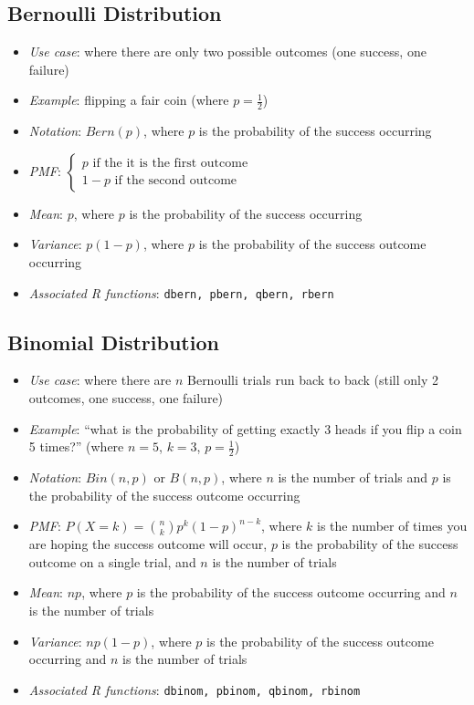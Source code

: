 \documentclass[12pt]{article}
\begin{document}
\subsection{Bernoulli Distribution}
\begin{itemize}
	\item \textit{Use case}: where there are only two possible outcomes (one success, one failure)
	\item \textit{Example}: flipping a fair coin (where $p = \frac{1}{2}$)
	\item \textit{Notation}: $Bern(p)$, where $p$ is the probability of the success occurring
	\item \textit{PMF}: $\begin{cases}
			      p \text{ if the it is the first outcome} \\
			      1 - p \text{ if the second outcome}
		      \end{cases}$
	\item \textit{Mean}: $p$, where $p$ is the probability of the success occurring
	\item \textit{Variance}: $p(1-p)$, where $p$ is the probability of the success outcome occurring
	\item \textit{Associated R functions}: \verb|dbern, pbern, qbern, rbern|
\end{itemize}

\subsection{Binomial Distribution}
\begin{itemize}
	\item \textit{Use case}: where there are $n$ Bernoulli trials run back to
	      back (still only 2 outcomes, one success, one failure)
	\item \textit{Example}: ``what is the probability of getting exactly 3
	      heads if you flip a coin 5 times?'' (where $n = 5$, $k = 3$, $p = \frac{1}{2}$)
	\item \textit{Notation}: $Bin(n,p)$ or $B(n, p)$, where $n$
	      is the number of trials and $p$ is the probability of
	      the success outcome occurring
	\item \textit{PMF}: $P(X = k) = {n \choose k} p^k (1-p)^{n-k}$, where $k$ is the number
	      of times you are hoping the success outcome will occur, $p$ is the
	      probability of the success outcome on a single trial, and $n$ is the
	      number of trials
	\item \textit{Mean}: $np$, where $p$ is the probability of the success outcome occurring and $n$ is the number of trials
	\item \textit{Variance}: $np(1-p)$, where $p$ is the probability of the success outcome occurring and $n$ is the number of trials
	\item \textit{Associated R functions}: \verb|dbinom, pbinom, qbinom, rbinom|
\end{itemize}
\end{document}
